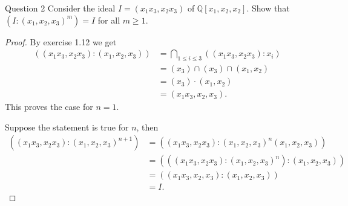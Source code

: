 \documentclass{article}
\newcommand{\Q}{\mathbb{Q}}
\newenvironment{question}[1][]{\begin{paragraph}{Question #1}}{\end{paragraph}}
\theoremstyle{definition}
\begin{document}
\begin{question}[2]
    Consider the ideal \(I=(x_{1}x_{3},x_{2}x_{3})\) of
    \(\Q[x_{1},x_{2},x_{2}]\). Show that \((I:(x_{1},x_{2},x_{3})^{m})=I\) for
    all \(m\geq 1\).

    \begin{proof}
        By exercise 1.12 we get
        \begin{align*}
            ((x_{1}x_{3},x_{2}x_{3}):(x_{1},x_{2},x_{3})) & =\bigcap_{1\leq i\leq 3}((x_{1}x_{3},x_{2}x_{3}):x_{i}) \\
                                                          & =(x_{3})\cap(x_{3})\cap(x_{1},x_{2})                    \\
                                                          & =(x_{3})\cdot(x_{1},x_{2})                              \\
                                                          & =(x_{1}x_{3},x_{2},x_{3}).
        \end{align*}
        This proves the case for \(n=1\).

        Suppose the statement is true for \(n\), then
        \begin{align*}
            ((x_{1}x_{3},x_{2}x_{3}):(x_{1},x_{2},x_{3})^{n+1}) & =((x_{1}x_{3},x_{2}x_{3}):(x_{1},x_{2},x_{3})^{n}(x_{1},x_{2},x_{3}))    \\
                                                                & =(((x_{1}x_{3},x_{2}x_{3}):(x_{1},x_{2},x_{3})^{n}):(x_{1},x_{2},x_{3})) \\
                                                                & =((x_{1}x_{3},x_{2},x_{3}):(x_{1},x_{2},x_{3}))                          \\
                                                                & =I.
        \end{align*}
    \end{proof}
\end{question}
\end{document}
